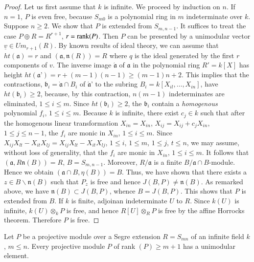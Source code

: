 \begin{proof}
Let us first assume that $k$ is infinite. We proceed by induction on
$n$. If $n=1$, $P$ is even free, because $S_{m0}$ is a polynomial ring
in $m$ indeterminate over $k$. Suppose $n\geq 2$. We show that $P$ is
extended from $S_{m,n-1}$. It suffices to treat the case $P\oplus
R=R^{r+1}$, $r=\operatorname{rank}(P)$. Then $P$ can be presented by a unimodular
vector $\underline{v}\in Um_{r+1}(R)$. By known results of ideal
theory, we can assume that $ht(\mathfrak{a})=r$ and
$(\mathfrak{a},\mathfrak{n}(R))=R$ where $q$ is the ideal generated by
the first $r$ components of $v$. The inverse image $\acute{\mathfrak{a}}$ of
$\mathfrak{a}$ in the polynomial ring $R'=k[X]$ has height
$ht(\mathfrak{a}\text{'})=r+(m-1)(n-1)\geq (m-1)n+2$. This implies
that the contractions, $\mathfrak{b}_{i}=\grave{\mathfrak{a}}\cap
B_{i}$ of $\acute{\mathfrak{a}}$' to the subring
$B_{i}=k[X_{il},\ldots,X_{in}]$, have $ht(\mathfrak{b}_{i})\geq 2$,
because, by this contraction, $n(m-1)$ indeterminates are eliminated,
$1\leq i\leq m$. Since $ht(\mathfrak{b}_{i})\geq 2$, the
$\mathfrak{b}_{i}$ contain a {\em homogenous} polynomial $f_{i}$,
$1\leq i\leq m$. Because $k$ is infinite, there exist $c_{j}\in k$
such that after the homogenous linear transformation $X_{in}=X_{in}$,
$X_{ij}=X_{ij}+c_{j}X_{in}$, $1\leq j\leq n-1$, the $f_{i}$ are monic
in $X_{in}$, $1\leq i\leq m$. Since
$X_{ij}X_{lt}-X_{it}X_{lj}=X_{ij}X_{lt}-X_{it}X_{lj}$, $1\leq i$,
$1\leq m$, $1\leq j$, $t\leq n$, we may assume, without loss of
generality, that the $f_{i}$ are monic in $X_{in}$, $1\leq i\leq
m$. It follows that $(\mathfrak{a},R\mathfrak{n}(B))=R$,
$B=S_{m,n-1}$. Moreover, $R/\mathfrak{a}$ is a finite
$B/\mathfrak{a}\cap B$-module. Hence we obtain $(\mathfrak{a}\cap
B,\eta(B))=B$. Thus, we have shown that there exists a $z\in
B\backslash \mathfrak{n}(B)$ such that $P_{z}$ is free and hence
$J(B,P)\neq \mathfrak{n}(B)$. As remarked above, we have
$\mathfrak{n}(B)\subset J(B,P)$, whence $B=J(B,P)$. This shows that
$P$ is extended from $B$. If $k$ is finite, adjoin\pageoriginale an
indeterminate $U$ to $R$. Since $k(U)$ is infinite, $k(U)\otimes_{k}P$
is free, and hence $R[U]\otimes_{R}P$ is free by the affine Horrocks
theorem. Therefore $P$ is free.
\end{proof}

\begin{subthm}\label{chap10-thm2.8}
Let $P$ be a projective module over a Segre extension $R=S_{mn}$ of an
infinite field $k$, $m\leq n$. Every projective module $P$ of rank
$(P)\geq m+1$ has a unimodular element.
\end{subthm}

